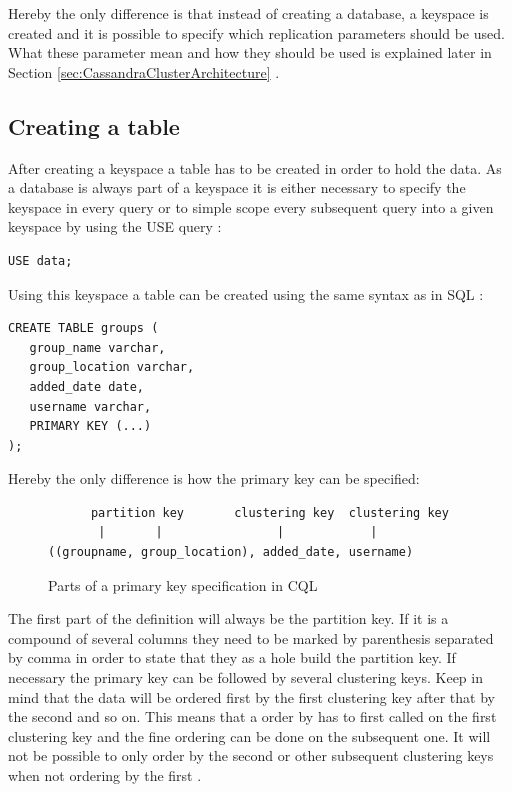 Hereby the only difference is that instead of creating a database, a keyspace is created and it is possible to specify which replication parameters should be used. What these parameter mean and how they should be used is explained later in Section \ref{sec:CassandraClusterArchitecture} \autocite{cqlAlexMeng}.

\subsection{Creating a table}
After creating a keyspace a table has to be created in order to hold the data. As a database is always part of a keyspace it is either necessary to specify the keyspace in every query or to simple scope every subsequent query into a given keyspace by using the USE query \autocite{cassandra3cqldocUse}:
\begin{verbatim}
USE data;
\end{verbatim}

Using this keyspace a table can be created using the same syntax as in SQL \autocite{cqlAlexMeng, newInCQL3, cassandra3cqldocCreateTable}:
\begin{verbatim}
CREATE TABLE groups (
   group_name varchar,
   group_location varchar,
   added_date date,
   username varchar,
   PRIMARY KEY (...)
);
\end{verbatim}

Hereby the only difference is how the primary key can be specified:
\begin{figure}[ht]
    \centering
\begin{verbatim}
      partition key       clustering key  clustering key
       |       |                |            |
((groupname, group_location), added_date, username)
\end{verbatim}
    \caption{Parts of a primary key specification in CQL \autocite{cqlPrimaryKeyDefinition}}
    \label{fig:cassandra:primaryKeyDefinition}
\end{figure}
The first part of the definition will always be the partition key. If it is a compound of several columns they need to be marked by parenthesis separated by comma in order to state that they as a hole build the partition key. If necessary the primary key can be followed by several clustering keys. Keep in mind that the data will be ordered first by the first clustering key after that by the second and so on. This means that a order by has to first called on the first clustering key and the fine ordering can be done on the subsequent one. It will not be possible to only order by the second or other subsequent clustering keys when not ordering by the first \autocite{cqlPrimaryKeyDefinition, cassandra3cqldocCreateTable}.

